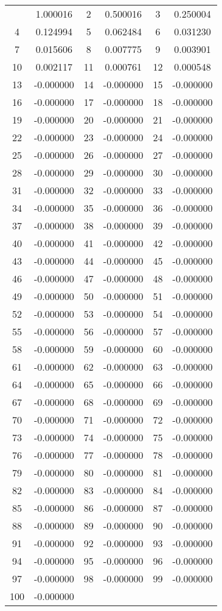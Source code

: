 \documentclass[12pt]{article}
\begin{document}
\begin{longtable}{@{}cc|cc|cc@{}}
\bottomrule
\endlastfoot
1 & 1.000016 & 2 & 0.500016 & 3 & 0.250004 \\
4 & 0.124994 & 5 & 0.062484 & 6 & 0.031230 \\
7 & 0.015606 & 8 & 0.007775 & 9 & 0.003901 \\
10 & 0.002117 & 11 & 0.000761 & 12 & 0.000548 \\
13 & -0.000000 & 14 & -0.000000 & 15 & -0.000000 \\
16 & -0.000000 & 17 & -0.000000 & 18 & -0.000000 \\
19 & -0.000000 & 20 & -0.000000 & 21 & -0.000000 \\
22 & -0.000000 & 23 & -0.000000 & 24 & -0.000000 \\
25 & -0.000000 & 26 & -0.000000 & 27 & -0.000000 \\
28 & -0.000000 & 29 & -0.000000 & 30 & -0.000000 \\
31 & -0.000000 & 32 & -0.000000 & 33 & -0.000000 \\
34 & -0.000000 & 35 & -0.000000 & 36 & -0.000000 \\
37 & -0.000000 & 38 & -0.000000 & 39 & -0.000000 \\
40 & -0.000000 & 41 & -0.000000 & 42 & -0.000000 \\
43 & -0.000000 & 44 & -0.000000 & 45 & -0.000000 \\
46 & -0.000000 & 47 & -0.000000 & 48 & -0.000000 \\
49 & -0.000000 & 50 & -0.000000 & 51 & -0.000000 \\
52 & -0.000000 & 53 & -0.000000 & 54 & -0.000000 \\
55 & -0.000000 & 56 & -0.000000 & 57 & -0.000000 \\
58 & -0.000000 & 59 & -0.000000 & 60 & -0.000000 \\
61 & -0.000000 & 62 & -0.000000 & 63 & -0.000000 \\
64 & -0.000000 & 65 & -0.000000 & 66 & -0.000000 \\
67 & -0.000000 & 68 & -0.000000 & 69 & -0.000000 \\
70 & -0.000000 & 71 & -0.000000 & 72 & -0.000000 \\
73 & -0.000000 & 74 & -0.000000 & 75 & -0.000000 \\
76 & -0.000000 & 77 & -0.000000 & 78 & -0.000000 \\
79 & -0.000000 & 80 & -0.000000 & 81 & -0.000000 \\
82 & -0.000000 & 83 & -0.000000 & 84 & -0.000000 \\
85 & -0.000000 & 86 & -0.000000 & 87 & -0.000000 \\
88 & -0.000000 & 89 & -0.000000 & 90 & -0.000000 \\
91 & -0.000000 & 92 & -0.000000 & 93 & -0.000000 \\
94 & -0.000000 & 95 & -0.000000 & 96 & -0.000000 \\
97 & -0.000000 & 98 & -0.000000 & 99 & -0.000000 \\
100 & -0.000000 &  &  &  &  \\

\end{longtable}
\end{document}
